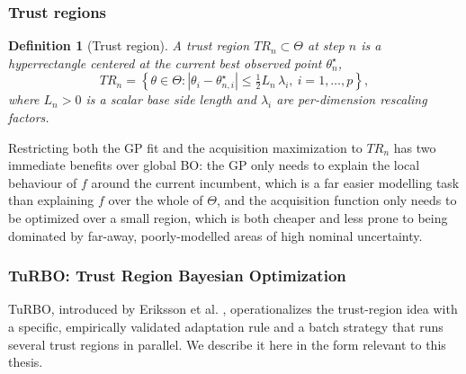 \documentclass{article}
\newtheorem{defn}{Definition}
\begin{document}
	\subsubsection{Trust regions}
	
	\begin{defn}[Trust region]
		A \textit{trust region} $TR_n \subset \Theta$ at step $n$ is a hyperrectangle centered at the current best observed point $\theta^\star_n$,
		\begin{equation}
			TR_n = \left\{ \theta \in \Theta : |\theta_i - \theta^\star_{n,i}| \le \tfrac{1}{2} L_n \, \lambda_i, \ i = 1, \dots, p \right\},
		\end{equation}
		where $L_n > 0$ is a scalar \textit{base side length} and $\lambda_i$ are per-dimension rescaling factors.
	\end{defn}
	
	Restricting both the GP fit and the acquisition maximization to $TR_n$ has two immediate benefits over global BO: the GP only needs to explain the local behaviour of $f$ around the current incumbent, which is a far easier modelling task than explaining $f$ over the whole of $\Theta$, and the acquisition function only needs to be optimized over a small region, which is both cheaper and less prone to being dominated by far-away, poorly-modelled areas of high nominal uncertainty.
	
	\subsubsection{TuRBO: Trust Region Bayesian Optimization}
	
	TuRBO, introduced by Eriksson et al. \cite{Eriksson2019}, operationalizes the trust-region idea with a specific, empirically validated adaptation rule and a batch strategy that runs several trust regions in parallel. We describe it here in the form relevant to this thesis.
	
\end{document}
